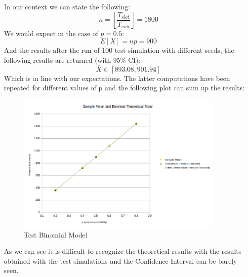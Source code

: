 In our context we can state the following:
\begin{equation}
	n = \left \lfloor{\dfrac{T_{slot}}{T_{sim}}}\right \rfloor = 1800
\end{equation}
We would expect in the case of $p = 0.5$:
\begin{equation}
	E[X] = np = 900
\end{equation}
And the results after the run of 100 test simulation with different seeds, the following results are returned (with 95\% CI):
\begin{equation}
	\overline{X} \in [893.08, 901.94]
\end{equation}
Which is in line with our expectations. The latter computations have been repeated for different values of p and the following plot can sum up the results:

\begin{figure}[H]
	\centering
	\includegraphics[width=0.9\textwidth]{img/plotTheoreticalMeanBinomial.png}
	\caption{Test Binomial Model}
	\label {img: consistencyTest1b}
\end{figure}

As we can see it is difficult to recognize the theoretical results with the results obtained with the test simulations and the Confidence Interval can be barely seen.

